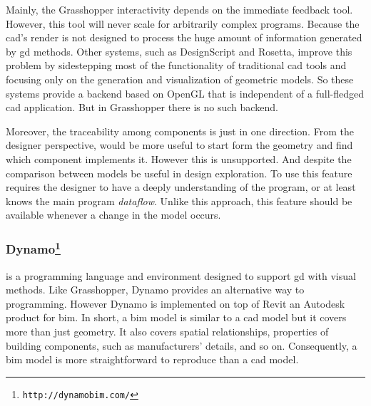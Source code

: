 Mainly, the Grasshopper interactivity depends on the immediate feedback tool. However, this tool will never scale for arbitrarily complex programs. Because the \ac{cad}'s render is not designed to process the huge amount of information generated by \ac{gd} methods. Other systems, such as DesignScript and Rosetta, improve this problem by sidestepping most of the functionality of traditional \ac{cad} tools and focusing only on the generation and visualization of geometric models. So these systems provide a backend based on OpenGL that is independent of a full-fledged \ac{cad} application. But in Grasshopper there is no such backend.

Moreover, the traceability among components is just in one direction. From the designer perspective, would be more useful to start form the geometry and find which component implements it. However this is unsupported. And despite the comparison between models be useful in design exploration. To use this feature requires the designer to have a deeply understanding of the program, or at least knows the main program \textit{dataflow}. Unlike this approach, this feature should be available whenever a change in the model occurs.
\subsubsection{Dynamo\protect\footnote{\texttt{http://dynamobim.com/}}} is a programming language and environment designed to support \ac{gd} with visual methods. Like Grasshopper, Dynamo provides an alternative way to programming. However Dynamo is implemented on top of Revit an Autodesk product for \ac{bim}. In short, a \ac{bim} model is similar to a \ac{cad} model but it covers more than just geometry. It also covers spatial relationships, properties of building components, such as manufacturers' details, and so on. Consequently, a \ac{bim} model is more straightforward to reproduce than a \ac{cad} model. 

